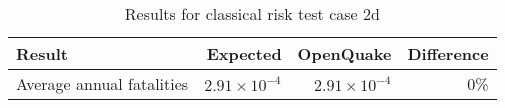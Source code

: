 \begin{table}[htbp]

\centering
\begin{tabular}{ l r r r }

\hline
\rowcolor{anti-flashwhite}
\bf{Result} & \bf{Expected} & \bf{OpenQuake} & \bf{Difference}\\
\hline
Average annual fatalities & $2.91 \times 10^{-4}$ & $2.91 \times 10^{-4}$ & 0\% \\
\hline
\end{tabular}

\caption{Results for classical risk test case 2d}
\label{tab:result-cr-2d}
\end{table}